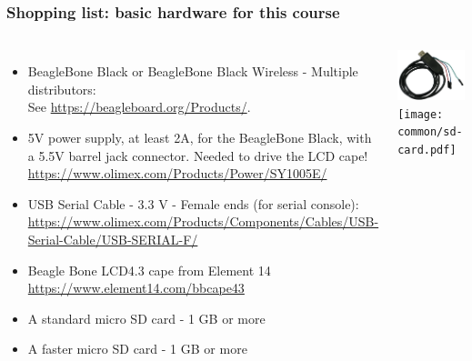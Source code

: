 \begin{frame}
\frametitle{Shopping list: basic hardware for this course}
  \begin{columns}
    \begin{itemize}
      \item BeagleBone Black or BeagleBone Black Wireless - Multiple distributors: \\
	    See \url{https://beagleboard.org/Products/}.
      \item 5V power supply, at least 2A, for the BeagleBone Black, with a 5.5V barrel
            jack connector. Needed to drive the LCD cape!\\
	    \url{https://www.olimex.com/Products/Power/SY1005E/}
      \item USB Serial Cable - 3.3 V - Female ends (for serial console): \\
	    \url{https://www.olimex.com/Products/Components/Cables/USB-Serial-Cable/USB-SERIAL-F/}
      \item Beagle Bone LCD4.3 cape from Element 14\\
            \url{https://www.element14.com/bbcape43}
      \item A standard micro SD card - 1 GB or more
      \item A faster micro SD card - 1 GB or more
    \end{itemize}
    \includegraphics[height=0.20\textheight]{common/usb-serial-cable-female.png} \\
    \texttt{[image: common/sd-card.pdf]} \\
  \end{columns}
\end{frame}

